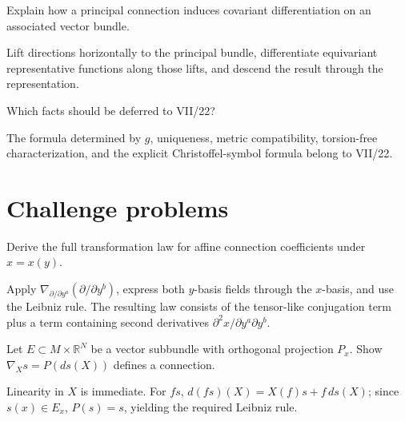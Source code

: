 \begin{problem}\label{prob:vii21-11}
Explain how a principal connection induces covariant differentiation on an associated vector bundle.
\end{problem}
\begin{solution}
Lift directions horizontally to the principal bundle, differentiate equivariant representative functions along those lifts, and descend the result through the representation.
\end{solution}

\begin{problem}\label{prob:vii21-12}
Which facts should be deferred to VII/22?
\end{problem}
\begin{solution}
The formula determined by \(g\), uniqueness, metric compatibility, torsion-free characterization, and the explicit Christoffel-symbol formula belong to VII/22.
\end{solution}

\section{Challenge problems}

\begin{problem}\label{prob:vii21-ch01}
Derive the full transformation law for affine connection coefficients under \(x=x(y)\).
\end{problem}
\begin{solution}
Apply \(\nabla_{\partial/\partial y^a}(\partial/\partial y^b)\), express both \(y\)-basis fields through the \(x\)-basis, and use the Leibniz rule. The resulting law consists of the tensor-like conjugation term plus a term containing second derivatives \(\partial^2x/\partial y^a\partial y^b\).
\end{solution}

\begin{problem}\label{prob:vii21-ch02}
Let \(E\subset M\times\mathbb R^N\) be a vector subbundle with orthogonal projection \(P_x\). Show \(\nabla_Xs=P(ds(X))\) defines a connection.
\end{problem}
\begin{solution}
Linearity in \(X\) is immediate. For \(fs\), \(d(fs)(X)=X(f)s+f\,ds(X)\); since \(s(x)\in E_x\), \(P(s)=s\), yielding the required Leibniz rule.
\end{solution}

